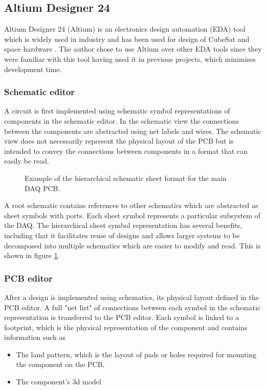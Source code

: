 \documentclass[draft]{report}
\begin{document}
\subsection{Altium Designer 24}

Altium Designer 24 (Altium) is an electronics design automation (EDA) tool which is widely used in industry and has been used for design of CubeSat and space hardware \cite{10061409}.
The author chose to use Altium over other EDA tools since they were familiar with this tool having used it in previous projects, which minimises development time.

\subsubsection{Schematic editor}
\label{sec:schematic-editor}
A circuit is first implemented using schematic symbol representations of components in the schematic editor. In the schematic view the connections between the components are abstracted using net labels and wires. The schematic view does not necessarily represent the physical layout of the PCB but is intended to convey the connections between components in a format that can easily be read.

\begin{figure}[H]
  \centering
  
  \caption{Example of the hierarchical schematic sheet format for the main DAQ PCB.}
  \label{fig:altium-schematic-hierarchical}
\end{figure}

A root schematic contains references to other schematics which are abstracted as sheet symbols with ports. Each sheet symbol represents a particular subsystem of the DAQ. The hierarchical sheet symbol representation has several benefits, including that it facilitates reuse of designs and allows larger systems to be decomposed into multiple schematics which are easier to modify and read. This is shown in figure \ref{fig:altium-schematic-hierarchical}.

\subsubsection{PCB editor}
\label{sec:pcb-editor}
After a design is implemented using schematics, its physical layout defined in the PCB editor.
A full "net list" of connections between each symbol in the schematic representation is transferred to the PCB editor. Each symbol is linked to a footprint, which is the physical representation of the component and contains information such as
\begin{itemize}
  \item The land pattern, which is the layout of pads or holes required for mounting the component on the PCB,
  \item The component's 3d model
\end{itemize}
\end{document}
